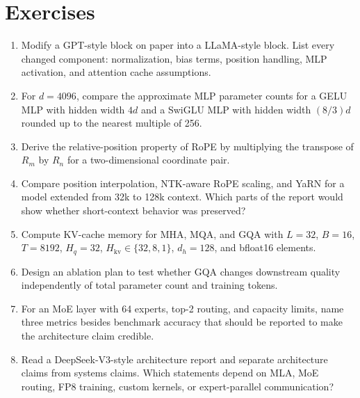 \section{Exercises}
\label{sec:chapter-five-exercises}

\begin{enumerate}
\item Modify a GPT-style block on paper into a LLaMA-style block. List every changed component: normalization, bias terms, position handling, MLP activation, and attention cache assumptions.
\item For $d=4096$, compare the approximate MLP parameter counts for a GELU MLP with hidden width $4d$ and a SwiGLU MLP with hidden width $(8/3)d$ rounded up to the nearest multiple of 256.
\item Derive the relative-position property of RoPE by multiplying the transpose of $R_m$ by $R_n$ for a two-dimensional coordinate pair.
\item Compare position interpolation, NTK-aware RoPE scaling, and YaRN for a model extended from 32k to 128k context. Which parts of the report would show whether short-context behavior was preserved?
\item Compute KV-cache memory for MHA, MQA, and GQA with $L=32$, $B=16$, $T=8192$, $H_q=32$, $H_{\mathrm{kv}}\in\{32,8,1\}$, $d_h=128$, and bfloat16 elements.
\item Design an ablation plan to test whether GQA changes downstream quality independently of total parameter count and training tokens.
\item For an MoE layer with 64 experts, top-2 routing, and capacity limits, name three metrics besides benchmark accuracy that should be reported to make the architecture claim credible.
\item Read a DeepSeek-V3-style architecture report and separate architecture claims from systems claims. Which statements depend on MLA, MoE routing, FP8 training, custom kernels, or expert-parallel communication?
\end{enumerate}

